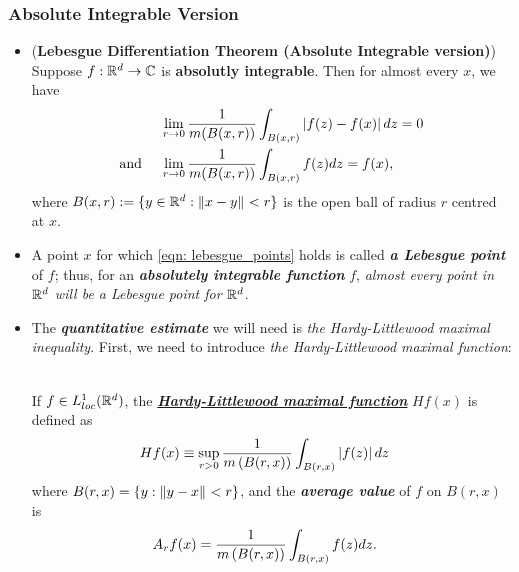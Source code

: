 \documentclass[11pt]{article}
\begin{document}
\subsubsection{Absolute Integrable Version}
\begin{itemize}
\item \begin{theorem}(\textbf{Lebesgue Differentiation Theorem  (Absolute Integrable version)}) \citep{tao2011introduction}\\
Suppose $f: {\mathbb R}^{d} \rightarrow {\mathbb C}$ is \textbf{absolutly integrable}. Then for almost every $x$, we have 
\begin{align}
&\lim\limits_{r\rightarrow 0}\frac{1}{m(B(x, r))}\int_{B(x, r)}\left\lvert f(z) - f(x) \right\rvert dz = 0 \label{eqn: lebesgue_points}\\
\text{and }\quad & \lim\limits_{r\rightarrow 0}\frac{1}{m(B(x, r))}\int_{B(x, r)}f(z) dz = f(x), \nonumber
\end{align}
where $B(x, r) := \{ y \in {\mathbb R}^d : \left\|x - y\right\|_{} < r\}$ is the open ball of radius $r$ centred at $x$.
\end{theorem}

\item \begin{definition}
A point $x$ for which \eqref{eqn: lebesgue_points} holds is called \emph{\textbf{a Lebesgue point}} of $f$; thus, for an \textbf{\emph{absolutely integrable function}} $f$, \emph{almost every point in ${\mathbb R}^d$ will be a Lebesgue point for ${\mathbb R}^d$}.
\end{definition}


\item The \emph{\textbf{quantitative estimate}} we will need is \emph{the Hardy-Littlewood maximal inequality}. First, we need to introduce \emph{the Hardy-Littlewood maximal function}: 
\begin{definition}\citep{folland2013real}\\
If $f\in L_{loc}^{1}({\mathbb R}^{d})$, the \underline{\emph{\textbf{Hardy-Littlewood maximal function}}} $Hf(x)$ is defined as
\begin{align*}
Hf(x)&\equiv \sup_{r>0}\frac{1}{m\left(B(r,x)\right)}\int_{B(r,x)}\left\lvert f(z) \right\rvert dz
\end{align*}
where $B(r,x)= \left\{y: \left\|y-x\right\|_{}< r\right\}$, and the \emph{\textbf{average value}} of $f$ on $B(r,x)$ is 
\begin{align*}
A_{r}f(x)&=\frac{1}{m\left(B(r,x)\right)}\int_{B(r,x)}f(z)dz.
\end{align*}
\end{definition}


\end{itemize}
\end{document}
